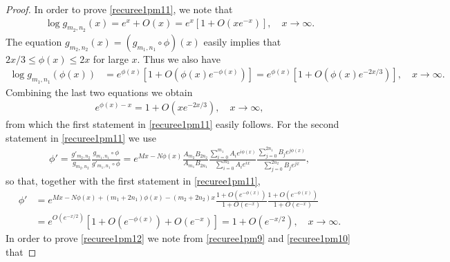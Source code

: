 \documentclass[12pt]{amsart}
\numberwithin{equation}{section}
\begin{document}
\begin{proof}
In order to prove \eqref{recuree1pm11}, we note that
\begin{equation*}%
\begin{split}
\log g_{m_2,n_2}(x)=e^{x}+O(x)=e^{x}\left[1+O(xe^{-x})\right], \quad x\to \infty.
\end{split}
\end{equation*}
The equation $g_{m_2,n_2}(x)=(g_{m_1,n_1}\circ\phi)(x)$ easily implies that $2x/3\leq \phi(x)\leq 2x$ for large $x$. Thus we also have
\begin{equation*}%
\begin{split}
\log g_{m_1,n_1}(\phi(x))&=e^{\phi(x)}\left[1+O(\phi(x)e^{-\phi(x)})\right]=e^{\phi(x)}\left[1+O(\phi(x)e^{-2x/3})\right], \quad x\to \infty.
\end{split}
\end{equation*}
Combining the last two equations we obtain
\begin{equation*}%
\begin{split}
e^{\phi(x)-x}=1+O(xe^{-2x/3}), \quad x\to \infty,
\end{split}
\end{equation*}
from which the first statement in \eqref{recuree1pm11} easily follows. For the second statement in \eqref{recuree1pm11} we use
\begin{equation}\label{recuree1pm16  bef0}
\begin{split}
\phi'=\frac{g'_{m_2,n_2}}{g_{m_2,n_2}}\frac{g_{m_1,n_1}\circ\phi}{g'_{m_1,n_1}\circ\phi}=e^{Mx-N\phi(x)}\frac{A_{m_2}B_{2n_2}}{A_{m_1}B_{2n_1}}\frac{\sum_{i=0}^{m_1}A_ie^{i\phi(x)}}{\sum_{i=0}^{m_2}A_ie^{ix}}\frac{\sum_{j=0}^{2n_1}B_je^{j\phi(x)}}{\sum_{j=0}^{2n_2}B_je^{jx}},
\end{split}
\end{equation}
so that, together with the first statement in \eqref{recuree1pm11},
\begin{equation}\label{recuree1pm17 bef1}
\begin{split}
\phi'&=e^{Mx-N\phi(x)+(m_1+2n_1)\phi(x)-(m_2+2n_2)x}\frac{1+O(e^{-\phi(x)})}{1+O(e^{-x})}\frac{1+O(e^{-\phi(x)})}{1+O(e^{-x})}\\
&=e^{O(e^{-x/2})}\left[1+O(e^{-\phi(x)})+O(e^{-x})\right]=1+O(e^{-x/2}), \quad x\to \infty.
\end{split}
\end{equation}
In order to prove \eqref{recuree1pm12} we note from \eqref{recuree1pm9} and \eqref{recuree1pm10} that

\end{proof}
\end{document}
